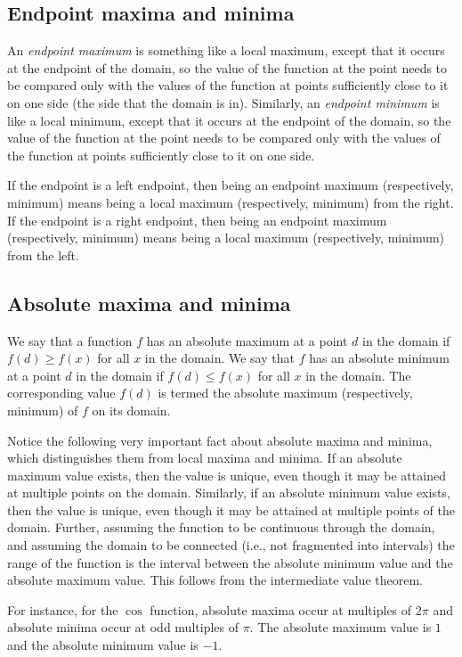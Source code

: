 \documentclass{amsart}
\begin{document}
\subsection{Endpoint maxima and minima}

An {\em endpoint maximum} is something like a local maximum, except
that it occurs at the endpoint of the domain, so the value of the
function at the point needs to be compared only with the values of the
function at points sufficiently close to it on one side (the side that
the domain is in). Similarly, an {\em endpoint minimum} is like a
local minimum, except that it occurs at the endpoint of the domain, so
the value of the function at the point needs to be compared only with
the values of the function at points sufficiently close to it on one
side.

If the endpoint is a left endpoint, then being an endpoint maximum
(respectively, minimum) means being a local maximum (respectively,
minimum) from the right. If the endpoint is a right endpoint, then
being an endpoint maximum (respectively, minimum) means being a local
maximum (respectively, minimum) from the left.

\subsection{Absolute maxima and minima}

We say that a function $f$ has an absolute maximum at a point $d$ in
the domain if $f(d) \ge f(x)$ for all $x$ in the domain. We say that
$f$ has an absolute minimum at a point $d$ in the domain if $f(d) \le
f(x)$ for all $x$ in the domain. The corresponding value $f(d)$ is
termed the absolute maximum (respectively, minimum) of $f$ on its
domain.

Notice the following very important fact about absolute maxima and
minima, which distinguishes them from local maxima and minima. If an
absolute maximum value exists, then the value is unique, even though
it may be attained at multiple points on the domain. Similarly, if an
absolute minimum value exists, then the value is unique, even though
it may be attained at multiple points of the domain. Further, assuming
the function to be continuous through the domain, and assuming the
domain to be connected (i.e., not fragmented into intervals) the range
of the function is the interval between the absolute minimum value and
the absolute maximum value. This follows from the intermediate value
theorem.

For instance, for the $\cos$ function, absolute maxima occur at
multiples of $2\pi$ and absolute minima occur at odd multiples of
$\pi$. The absolute maximum value is $1$ and the absolute minimum
value is $-1$.
\end{document}
